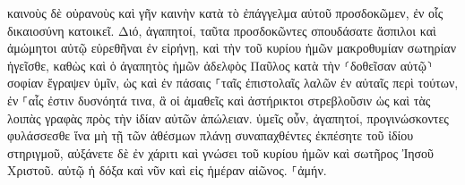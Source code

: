 \documentclass{openreader}
\begin{document}
καινοὺς δὲ οὐρανοὺς καὶ γῆν καινὴν κατὰ τὸ ἐπάγγελμα αὐτοῦ προσδοκῶμεν, ἐν οἷς δικαιοσύνη κατοικεῖ. 
Διό, ἀγαπητοί, ταῦτα προσδοκῶντες σπουδάσατε ἄσπιλοι καὶ ἀμώμητοι αὐτῷ εὑρεθῆναι ἐν εἰρήνῃ, 
καὶ τὴν τοῦ κυρίου ἡμῶν μακροθυμίαν σωτηρίαν ἡγεῖσθε, καθὼς καὶ ὁ ἀγαπητὸς ἡμῶν ἀδελφὸς Παῦλος κατὰ τὴν ⸂δοθεῖσαν αὐτῷ⸃ σοφίαν ἔγραψεν ὑμῖν, 
ὡς καὶ ἐν πάσαις ⸀ταῖς ἐπιστολαῖς λαλῶν ἐν αὐταῖς περὶ τούτων, ἐν ⸀αἷς ἐστιν δυσνόητά τινα, ἃ οἱ ἀμαθεῖς καὶ ἀστήρικτοι στρεβλοῦσιν ὡς καὶ τὰς λοιπὰς γραφὰς πρὸς τὴν ἰδίαν αὐτῶν ἀπώλειαν. 
ὑμεῖς οὖν, ἀγαπητοί, προγινώσκοντες φυλάσσεσθε ἵνα μὴ τῇ τῶν ἀθέσμων πλάνῃ συναπαχθέντες ἐκπέσητε τοῦ ἰδίου στηριγμοῦ, 
αὐξάνετε δὲ ἐν χάριτι καὶ γνώσει τοῦ κυρίου ἡμῶν καὶ σωτῆρος Ἰησοῦ Χριστοῦ. αὐτῷ ἡ δόξα καὶ νῦν καὶ εἰς ἡμέραν αἰῶνος. ⸀ἀμήν. 
\end{document}
